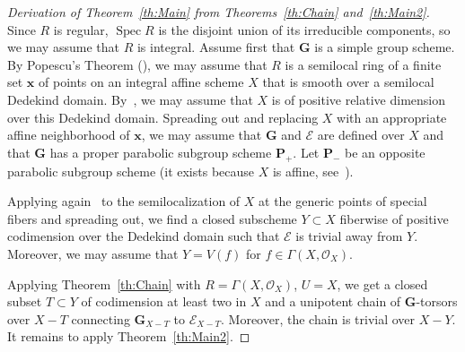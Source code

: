 \documentclass[11pt]{amsart}
\DeclareMathOperator\Spec{{Spec}}
\theoremstyle{plain}
\theoremstyle{definition}
\theoremstyle{remark}
\newcommand\cE{{\mathcal{E}}}
\newcommand\cO{{\mathcal{O}}}
\newcommand\bG{{\mathbf G}}
\newcommand\bP{{\mathbf P}}
\newcommand\bx{{\mathbf x}}
\begin{document}
\begin{proof}[Derivation of Theorem~\ref{th:Main} from Theorems~\ref{th:Chain} and~\ref{th:Main2}]
Since $R$ is regular, $\Spec R$ is the disjoint union of its irreducible components, so we may assume that $R$ is integral.
Assume first that $\bG$ is a simple group scheme. By Popescu's Theorem (\cite[Tag07GC]{StacksProject}), we may assume that $R$ is a semilocal ring of a finite set $\bx$ of points on an integral affine scheme $X$ that is smooth over a semilocal Dedekind domain. By~\cite[Thm.~1]{Guo2019GrSerreDedekind}, we may assume that $X$ is of positive relative dimension over this Dedekind domain. Spreading out and replacing $X$ with an appropriate affine neighborhood of $\bx$, we may assume that $\bG$ and $\cE$ are defined over $X$ and that $\bG$ has a proper parabolic subgroup scheme $\bP_+$. Let $\bP_-$ be an opposite parabolic subgroup scheme (it exists because $X$ is affine, see~\cite[exp.~XXVI, cor.~4.3.5(i)]{SGA3-3}).

Applying again~\cite{Guo2019GrSerreDedekind} to the semilocalization of $X$ at the generic points of special fibers and spreading out, we find a closed subscheme $Y\subset X$ fiberwise of positive codimension over the Dedekind domain such that $\cE$ is trivial away from $Y$. Moreover, we may assume that $Y=V(f)$ for $f\in\Gamma(X,\cO_X)$.

Applying Theorem~\ref{th:Chain} with $R=\Gamma(X,\cO_X)$, $U=X$, we get a closed subset $T\subset Y$ of codimension at least two in $X$ and a unipotent chain of $\bG$-torsors over $X-T$ connecting $\bG_{X-T}$ to $\cE_{X-T}$. Moreover, the chain is trivial over $X-Y$. It remains to apply Theorem~\ref{th:Main2}.


\end{proof}
\end{document}
